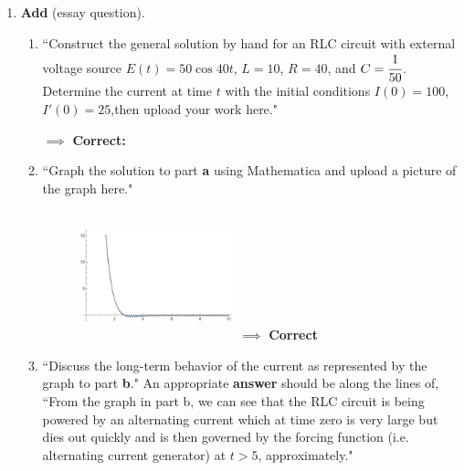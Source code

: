 \documentclass[fleqn]{article}[11pt]
\begin{document}
\begin{enumerate}
\begin{enumerate}
		\end{enumerate}
	
	\item \textbf{Add} (essay question).
	
		\begin{enumerate}
			\item ``Construct the general solution by hand for an RLC circuit with external voltage source $E(t)=50\cos{40t}$, $L=10$, $R=40$, and $C=\cfrac{1}{50}$. Determine the current at time $t$ with the initial conditions $I(0)=100$, $I'(0)=25$,then upload your work here." 
			
			$\implies$ \textbf{Correct:} 

			\item ``Graph the solution to part \textbf{\textup{a}} using Mathematica and upload a picture of the graph here." 	
				\begin{figure}[h]
					\centering
						\graphicspath{{/Users/tylertrogden/Desktop/}}				    \includegraphics[height=3.75cm,width=4.5cm]{W10_WQ_Q10} $\implies$ \textbf{Correct}
				\end{figure} 

			\item ``Discuss the long-term behavior of the current as represented by the graph to part \textbf{\textup{b}}." An appropriate \textbf{answer} should be along the lines of, ``From the graph in part b, we can see that the RLC circuit is being powered by an alternating current which at time zero is very large but dies out quickly and is then governed by the forcing function (i.e. alternating current generator) at $t > 5$, approximately." 
			
		\end{enumerate}
\end{enumerate}
\end{document}
